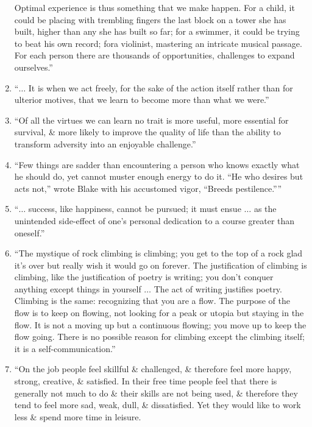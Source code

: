 \documentclass{article}
\numberwithin{equation}{section}
\begin{document}
\begin{enumerate}
	Optimal experience is thus something that we make happen. For a child, it could be placing with trembling fingers the last block on a tower she has built, higher than any she has built so far; for a swimmer, it could be trying to beat his own record; fora violinist, mastering an intricate musical passage. For each person there are thousands of opportunities, challenges to expand ourselves.''
	\item ``$\ldots$ It is when we act freely, for the sake of the action itself rather than for ulterior motives, that we learn to become more than what we were.''
	\item ``Of all the virtues we can learn no trait is more useful, more essential for survival, \& more likely to improve the quality of life than the ability to transform adversity into an enjoyable challenge.''
	\item ``Few things are sadder than encountering a person who knows exactly what he should do, yet cannot muster enough energy to do it. ``He who desires but acts not,'' wrote Blake with his accustomed vigor, ``Breeds pestilence.''''
	\item ``$\ldots$ success, like happiness, cannot be pursued; it must ensue $\ldots$ as the unintended side-effect of one's personal dedication to a course greater than oneself.''
	\item ``The mystique of rock climbing is climbing; you get to the top of a rock glad it's over but really wish it would go on forever. The justification of climbing is climbing, like the justification of poetry is writing; you don't conquer anything except things in yourself $\ldots$ The act of writing justifies poetry. Climbing is the same: recognizing that you are a flow. The purpose of the flow is to keep on flowing, not looking for a peak or utopia but staying in the flow. It is not a moving up but a continuous flowing; you move up to keep the flow going. There is no possible reason for climbing except the climbing itself; it is a self-communication.''
	\item ``On the job people feel skillful \& challenged, \& therefore feel more happy, strong, creative, \& satisfied. In their free time people feel that there is generally not much to do \& their skills are not being used, \& therefore they tend to feel more sad, weak, dull, \& dissatisfied. Yet they would like to work less \& spend more time in leisure.
	

\end{enumerate}
\end{document}
